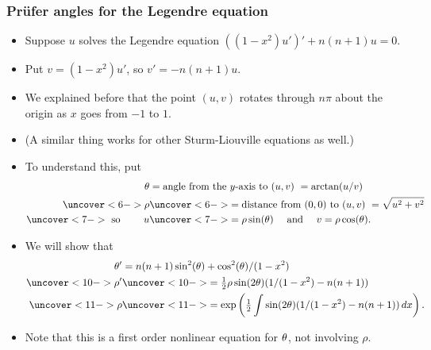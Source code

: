 \documentclass[9pt]{beamer}
\begin{document}
\begin{frame}[t]
 \frametitle{Pr\"ufer angles for the Legendre equation}
 
 \begin{itemize}
  \item<1-> Suppose $u$ solves the Legendre equation
   $((1-x^2)u')'+n(n+1)u=0$.
  \item<2-> Put $v=(1-x^2)u'$, so $v'=-n(n+1)u$.
  \item<3-> We explained before that the point $(u,v)$ rotates through
   $n\pi$ about the origin as $x$ goes from $-1$ to $1$.  
  \item<4-> (A similar thing works for other Sturm-Liouville equations as well.)
  \item<5-> To understand this, put 
   \begin{align*}
    \tht &= \text{angle from the $y$-axis to $(u,v)$ }
          = \arctan(u/v) \\
    \uc<6->{\rho} &\uc<6->{= \text{distance from $(0,0)$ to $(u,v)$ }
          = \sqrt{u^2+v^2}} \\
    \uc<7->{\text{ so } \qquad u} &\uc<7->{= \rho\sin(\tht)
                  \quad\text{ and  }\quad v=\rho\cos(\tht).}
   \end{align*}
  \item<8-> We will show that 
   \begin{align*}
    \tht' &= n(n+1)\sin^2(\tht) + \cos^2(\tht)/(1-x^2) \\
    \uc<10->{\rho'} &\uc<10->{= \half\rho\sin(2\tht)(1/(1-x^2)-n(n+1))} \\
    \uc<11->{\rho}  &\uc<11->{= \exp\left(\half\int \sin(2\tht)(1/(1-x^2)-n(n+1))\,dx\right).}
   \end{align*}
  \item<9-> Note that this is a first order nonlinear equation for $\theta$,
   not involving $\rho$.
 \end{itemize}
\end{frame}
\end{document}
